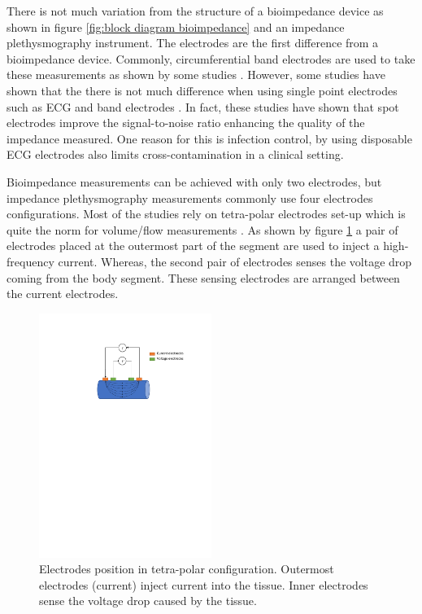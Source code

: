 There is not much variation from the structure of a bioimpedance device as shown in figure \ref{fig:block diagram bioimpedance} and an impedance plethysmography instrument. The electrodes are the first difference from a bioimpedance device. Commonly, circumferential band electrodes are used to take these measurements as shown by some studies \cite{ bera2014bioelectrical, mohapatra1979measurement, yamakoshi1980limb, porter1985measurement, corciova2011peripheral, anderson1984impedance}. However, some studies have shown that the there is not much difference when using single point electrodes such as ECG and band electrodes \cite{qu1986motion, sherwood1991comparison, patterson1991impedance}. In fact, these studies have shown that spot electrodes improve the signal-to-noise ratio enhancing the quality of the impedance measured. One reason for this is infection control, by using disposable ECG electrodes also limits cross-contamination in a clinical setting.

Bioimpedance measurements can be achieved with only two electrodes, but impedance plethysmography measurements commonly use four electrodes configurations. Most of the studies rely on tetra-polar electrodes set-up which is quite the norm for volume/flow measurements \cite{costeloe1980continuous, yamakoshi1980limb, nyboer1974blood, yamamoto1992impedance}. As shown by figure \ref{fig:tetrapolar iPG} a pair of electrodes placed at the outermost part of the segment are used to inject a high-frequency current. Whereas, the second pair of electrodes senses the voltage drop coming from the body segment. These sensing electrodes are arranged between the current electrodes. 

\begin{figure}[!htpb]
	\centering
	\includegraphics[width=0.5\textwidth,keepaspectratio]{tetrapolar_impedance}    
	\caption[Electrodes position in tetra-polar configuration]{Electrodes position in tetra-polar configuration. Outermost electrodes (current) inject current into the tissue. Inner electrodes sense the voltage drop caused by the tissue.}
	\label{fig:tetrapolar iPG}
\end{figure}

